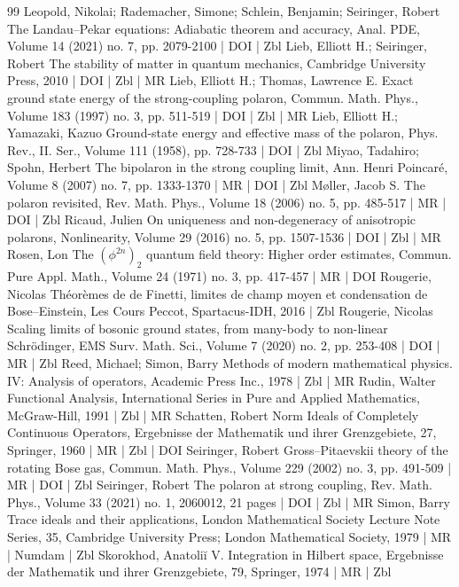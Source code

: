 \documentclass[10pt]{amsart}
\theoremstyle{definition}\newtheorem{defi}[theo]{Definition}\newtheorem{rema}[theo]{Remark}\newtheorem{exam}[theo]{Example}\newtheorem{exem}[theo]{Example}\newtheorem{nota}[theo]{Notation}
\newcommand{\1}{\mathds{1}}
\begin{document}
\begin{thebibliography}{99}
 Leopold, Nikolai; Rademacher, Simone; Schlein, Benjamin; Seiringer, Robert The Landau–Pekar equations: Adiabatic theorem and accuracy, Anal. PDE, Volume 14 (2021) no. 7, pp. 2079-2100 | DOI | Zbl
 Lieb, Elliott H.; Seiringer, Robert The stability of matter in quantum mechanics, Cambridge University Press, 2010 | DOI | Zbl | MR
 Lieb, Elliott H.; Thomas, Lawrence E. Exact ground state energy of the strong-coupling polaron, Commun. Math. Phys., Volume 183 (1997) no. 3, pp. 511-519 | DOI | Zbl | MR
 Lieb, Elliott H.; Yamazaki, Kazuo Ground-state energy and effective mass of the polaron, Phys. Rev., II. Ser., Volume 111 (1958), pp. 728-733 | DOI | Zbl
 Miyao, Tadahiro; Spohn, Herbert The bipolaron in the strong coupling limit, Ann. Henri Poincaré, Volume 8 (2007) no. 7, pp. 1333-1370 | MR | DOI | Zbl
 Møller, Jacob S. The polaron revisited, Rev. Math. Phys., Volume 18 (2006) no. 5, pp. 485-517 | MR | DOI | Zbl
 Ricaud, Julien On uniqueness and non-degeneracy of anisotropic polarons, Nonlinearity, Volume 29 (2016) no. 5, pp. 1507-1536 | DOI | Zbl | MR
 Rosen, Lon The $(\phi^{2n})_2$  quantum field theory: Higher order estimates, Commun. Pure Appl. Math., Volume 24 (1971) no. 3, pp. 417-457 | MR | DOI
 Rougerie, Nicolas Théorèmes de de Finetti, limites de champ moyen et condensation de Bose–Einstein, Les Cours Peccot, Spartacus-IDH, 2016 | Zbl
 Rougerie, Nicolas Scaling limits of bosonic ground states, from many-body to non-linear Schrödinger, EMS Surv. Math. Sci., Volume 7 (2020) no. 2, pp. 253-408 | DOI | MR | Zbl
 Reed, Michael; Simon, Barry Methods of modern mathematical physics. IV: Analysis of operators, Academic Press Inc., 1978 | Zbl | MR
 Rudin, Walter Functional Analysis, International Series in Pure and Applied Mathematics, McGraw-Hill, 1991 | Zbl | MR
 Schatten, Robert Norm Ideals of Completely Continuous Operators, Ergebnisse der Mathematik und ihrer Grenzgebiete, 27, Springer, 1960 | MR | Zbl | DOI
 Seiringer, Robert Gross–Pitaevskii theory of the rotating Bose gas, Commun. Math. Phys., Volume 229 (2002) no. 3, pp. 491-509 | MR | DOI | Zbl
 Seiringer, Robert The polaron at strong coupling, Rev. Math. Phys., Volume 33 (2021) no. 1, 2060012, 21 pages | DOI | Zbl | MR
 Simon, Barry Trace ideals and their applications, London Mathematical Society Lecture Note Series, 35, Cambridge University Press; London Mathematical Society, 1979 | MR | Numdam | Zbl
 Skorokhod, Anatoliĭ V. Integration in Hilbert space, Ergebnisse der Mathematik und ihrer Grenzgebiete, 79, Springer, 1974 | MR | Zbl
\end{thebibliography}
\end{document}
